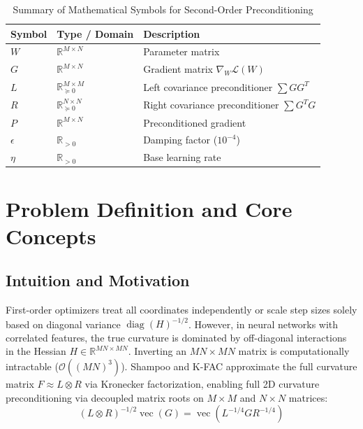 \documentclass[11pt,a4paper]{article}
\theoremstyle{definition}
\begin{document}
\begin{table}[h]
\centering
\caption{Summary of Mathematical Symbols for Second-Order Preconditioning}
\begin{tabular}{lll}
\toprule
\textbf{Symbol} & \textbf{Type / Domain} & \textbf{Description} \\
\midrule
$W$ & $\mathbb{R}^{M \times N}$ & Parameter matrix \\
$G$ & $\mathbb{R}^{M \times N}$ & Gradient matrix $\nabla_W \mathcal{L}(W)$ \\
$L$ & $\mathbb{R}^{M \times M}_{\succeq 0}$ & Left covariance preconditioner $\sum G G^T$ \\
$R$ & $\mathbb{R}^{N \times N}_{\succeq 0}$ & Right covariance preconditioner $\sum G^T G$ \\
$P$ & $\mathbb{R}^{M \times N}$ & Preconditioned gradient \\
$\epsilon$ & $\mathbb{R}_{> 0}$ & Damping factor ($10^{-4}$) \\
$\eta$ & $\mathbb{R}_{> 0}$ & Base learning rate \\
\bottomrule
\end{tabular}
\end{table}

\section{Problem Definition and Core Concepts}

\subsection{Intuition and Motivation}
First-order optimizers treat all coordinates independently or scale step sizes solely based on diagonal variance $\operatorname{diag}(H)^{-1/2}$. However, in neural networks with correlated features, the true curvature is dominated by off-diagonal interactions in the Hessian $H \in \mathbb{R}^{MN \times MN}$. Inverting an $MN \times MN$ matrix is computationally intractable ($\mathcal{O}((MN)^3)$). Shampoo and K-FAC approximate the full curvature matrix $F \approx L \otimes R$ via Kronecker factorization, enabling full 2D curvature preconditioning via decoupled matrix roots on $M \times M$ and $N \times N$ matrices:
\begin{equation}
(L \otimes R)^{-1/2} \operatorname{vec}(G) = \operatorname{vec}\left( L^{-1/4} G R^{-1/4} \right)
\end{equation}
\end{document}

